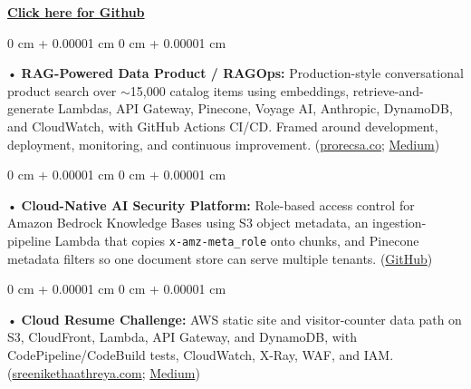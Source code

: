 \documentclass[10pt, letterpaper]{article}
\newenvironment{onecolentry}{
    \begin{adjustwidth}{
        0 cm + 0.00001 cm
    }{
        0 cm + 0.00001 cm
    }
}{
    \end{adjustwidth}
} %
\begin{document}
\textbf{\href{https://github.com/daedalus-s}{Click here for Github}}
\begin{onecolentry}
     • \textbf{RAG-Powered Data Product / RAGOps:} Production-style conversational product search over $\sim$15,000 catalog items using embeddings, retrieve-and-generate Lambdas, API Gateway, Pinecone, Voyage AI, Anthropic, DynamoDB, and CloudWatch, with GitHub Actions CI/CD. Framed around development, deployment, monitoring, and continuous improvement. (\href{https://prorecsa.co}{prorecsa.co}; \href{https://medium.com/@sreenikethaathreya/from-rags-to-riches-bba8a671d5e6}{Medium})
\end{onecolentry}
\begin{onecolentry}
     • \textbf{Cloud-Native AI Security Platform:} Role-based access control for Amazon Bedrock Knowledge Bases using S3 object metadata, an ingestion-pipeline Lambda that copies \texttt{x-amz-meta\_role} onto chunks, and Pinecone metadata filters so one document store can serve multiple tenants. (\href{https://github.com/daedalus-s/bedrock-acl-metadata}{GitHub})
\end{onecolentry}
\begin{onecolentry}
     • \textbf{Cloud Resume Challenge:} AWS static site and visitor-counter data path on S3, CloudFront, Lambda, API Gateway, and DynamoDB, with CodePipeline/CodeBuild tests, CloudWatch, X-Ray, WAF, and IAM. (\href{https://sreenikethaathreya.com}{sreenikethaathreya.com}; \href{https://medium.com/@sreenikethaathreya/cloud-resume-challenge-c4f17c3d53ff}{Medium})
\end{onecolentry}
\vspace{2 pt}
        \vspace{2 pt }
\end{document}

